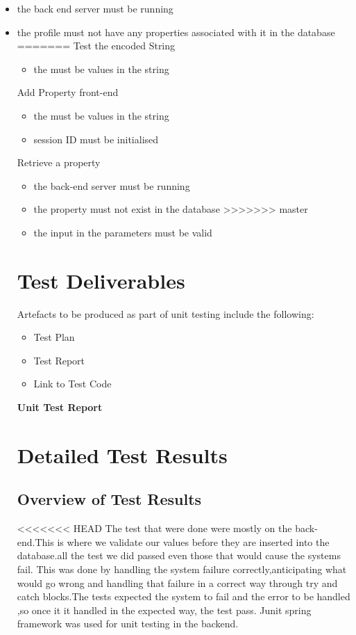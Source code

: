 \documentclass[a4paper,12pt]{article}
\begin{document}
\begin{itemize}
 \item the back end server must be running
 \item the profile must not have any properties associated with it in the database
=======
Test the encoded String 
\begin{itemize}
 \item the must be values in the string
\end{itemize}
Add Property front-end 
\begin{itemize}
 \item the must be values in the string
 \item session ID must be initialised
\end{itemize}
Retrieve a property
\begin{itemize}
 \item the back-end server must be running
 \item the property must not exist in the database
>>>>>>> master
 \item the input in the parameters must be valid
\end{itemize}
\section{Test Deliverables}
Artefacts to be produced as part of unit testing include the following:
\begin{itemize}
\item Test Plan
\item Test Report
\item Link to Test Code
\end{itemize}

\newpage
\begin{center}
{\huge \bfseries Unit Test Report}\\[0.5cm]
\end{center}
\section{Detailed Test Results}
\subsection{Overview of Test Results}
<<<<<<< HEAD
The test that were done were mostly on the back-end.This is where we validate our values before they are inserted into the database.all the test we did passed even those that would cause the systems fail. This was done by handling the system failure correctly,anticipating what would go wrong and handling that failure in a correct way through try and catch blocks.The tests expected the system to fail and the error to be handled ,so once it it handled in the expected way, the test pass. Junit spring framework was used for unit testing in the backend. 


\end{itemize}
\end{document}

